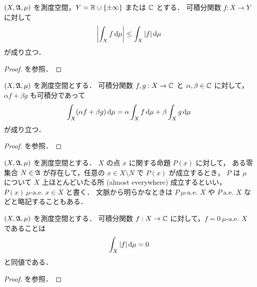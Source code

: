 \begin{theorem}
    $(X,\mathfrak{A},\mu)$ を測度空間，$Y=\mathbb{R}\cup\{\pm\infty\} $ または $\mathbb{C}$ とする．
    可積分関数 $f:X\to Y$ に対して
    \begin{align*}
        \left\lvert\int_Xf\,\mathrm{d}\mu\right\rvert
        \le\int_X|f|\,\mathrm{d}\mu
    \end{align*}
    が成り立つ．
\end{theorem}

\begin{proof}
    \cite[定理 12.1]{It63} を参照．
\end{proof}

\begin{theorem}
    $(X,\mathfrak{A},\mu)$ を測度空間とする．
    可積分関数 $f,g:X\to\mathbb{C}$ と $\alpha,\beta\in\mathbb{C}$ に対して，
    $\alpha f+\beta g$ も可積分であって
    \begin{align*}
        \int_X(\alpha f+\beta g)\,\mathrm{d}\mu
        =\alpha\int_Xf\,\mathrm{d}\mu+\beta\int_Xg\,\mathrm{d}\mu
    \end{align*}
    が成り立つ．
\end{theorem}

\begin{proof}
    \cite[定理 12.3, 系 1]{It63} を参照．
\end{proof}

\begin{definition}
    $(X,\mathfrak{A},\mu)$ を測度空間とする．
    $X$ の点 $x$ に関する命題 $P(x)$ に対して，
    ある零集合 $N\in\mathfrak{A}$ が存在して，任意の $x\in X\setminus N$ で $P(x)$ が成立するとき，
    $P$ は $\mu$ について $X$ 上ほとんどいたる所 (almost everywhere) 成立するといい，
    $P(x)\ \textrm{$\mu$-a.e.\ $x\in X$}$ と書く．
    文脈から明らかなときは $P\ \textrm{$\mu$-a.e.\ $X$}$ や $P\ \textrm{a.e.\ $X$}$ などと略記することもある．
\end{definition}

\begin{theorem}
    $(X,\mathfrak{A},\mu)$ を測度空間とする．
    可積分関数 $f:X\to\mathbb{C}$ に対して，$f=0\ \textrm{$\mu$-a.e.\ $X$}$ であることは
    \begin{align*}
        \int_X|f|\,\mathrm{d}\mu=0
    \end{align*}
    と同値である．
\end{theorem}

\begin{proof}
    \cite[定理 12.3, 系 2]{It63} を参照．
\end{proof}

